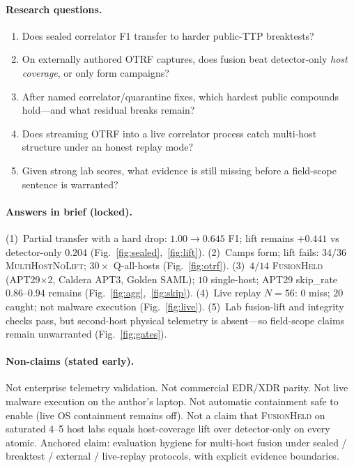\documentclass[conference,compsoc]{IEEEtran}
\begin{document}
\paragraph{Research questions.}
\begin{enumerate}
\item Does sealed correlator F1 transfer to harder public-TTP breaktests?
\item On externally authored OTRF captures, does fusion beat detector-only
\emph{host coverage}, or only form campaigns?
\item After named correlator/quarantine fixes, which hardest public compounds
hold---and what residual breaks remain?
\item Does streaming OTRF into a live correlator process catch multi-host
structure under an honest replay mode?
\item Given strong lab scores, what evidence is still missing before a
field-scope sentence is warranted?
\end{enumerate}

\paragraph{Answers in brief (locked).}
(1)~Partial transfer with a hard drop: $1.00\rightarrow 0.645$ F1; lift remains
$+0.441$ vs detector-only $0.204$ (Fig.~\ref{fig:sealed},~\ref{fig:lift}).
(2)~Camps form; lift fails: $34/36$ \textsc{MultiHostNoLift}; $30\times$
Q-all-hosts (Fig.~\ref{fig:otrf}).
(3)~$4/14$ \textsc{FusionHeld} (APT29$\times$2, Caldera APT3, Golden SAML);
$10$ single-host; APT29 skip\_rate $0.86$--$0.94$ remains
(Fig.~\ref{fig:agg},~\ref{fig:skip}).
(4)~Live replay $N{=}56$: $0$ miss; $20$ caught; not malware execution
(Fig.~\ref{fig:live}).
(5)~Lab fusion-lift and integrity checks pass, but second-host physical
telemetry is absent---so field-scope claims remain unwarranted
(Fig.~\ref{fig:gates}).

\paragraph{Non-claims (stated early).}
Not enterprise telemetry validation.
Not commercial EDR/XDR parity.
Not live malware execution on the author's laptop.
Not automatic containment safe to enable (live OS containment remains off).
Not a claim that \textsc{FusionHeld} on saturated 4--5 host labs equals
host-coverage lift over detector-only on every atomic.
Anchored claim: evaluation hygiene for multi-host fusion under sealed /
breaktest / external / live-replay protocols, with explicit evidence
boundaries.
\end{document}
